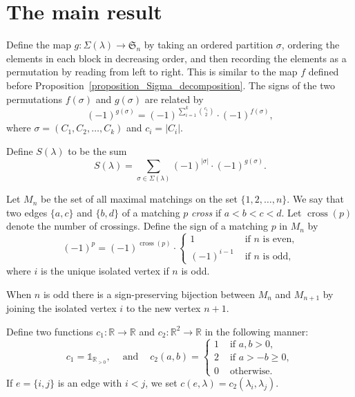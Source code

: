 \documentclass[ALCO,ThmDefs,Unicode,epreuves]{cedram}
\newcommand{\Rrr}{\mathbb{R}}
\newcommand{\Sym}{\mathfrak{S}}
\DeclareMathOperator{\cross}{cross}
\newcommand{\fl}{\rightarrow}
\newcommand{\ungras}{\mathds{1}}
\begin{document}
\section{The main result}
\label{section_main_result}

Define the map
$g : \Sigma(\lambda) \longrightarrow \Sym_{n}$
by taking  an ordered partition $\sigma$,
ordering the elements in each block in decreasing order,
and then
recording the elements as a permutation by reading from left to right.
This is similar to the map $f$ defined before
Proposition~\ref{proposition_Sigma_decomposition}.
The signs of the two permutations $f(\sigma)$ and $g(\sigma)$
are related by
$$
 (-1)^{g(\sigma)} = (-1)^{\sum_{i=1}^{k} \binom{c_{i}}{2}} \cdot (-1)^{f(\sigma)} ,
$$
where $\sigma = (C_{1},C_{2}, \ldots, C_{k})$ and $c_{i} = |C_{i}|$.

Define $S(\lambda)$ to be the sum
\begin{equation}
S(\lambda)
=
\sum_{\sigma \in \Sigma(\lambda)}
(-1)^{|\sigma|} \cdot (-1)^{g(\sigma)} . 
\label{equation_S_lambda}
\end{equation}


Let $M_{n}$ be the set of all
maximal matchings
on the set $\{1,2, \ldots,n\}$.
We say that two edges $\{a,c\}$ and $\{b,d\}$ of a matching $p$
\emph{cross} if $a<b<c<d$. Let $\cross(p)$ denote the number of crossings.
Define the sign of a matching $p$ in $M_{n}$
by
$$   (-1)^{p} = (-1)^{\cross(p)} \cdot
\begin{cases}
1 & \text{ if $n$ is even,} \\
(-1)^{i-1} & \text{ if $n$ is odd,}
\end{cases}
$$
where $i$ is the unique isolated vertex if $n$ is odd.

\begin{remark}
{\rm
When $n$ is odd
there is a sign-preserving bijection
between $M_{n}$ and $M_{n+1}$
by joining the isolated vertex $i$ to the new vertex $n+1$.
}
\label{remark_add_extra_edge}
\end{remark}








Define two functions $c_{1} : \Rrr \fl \Rrr$ and
$c_{2} : \Rrr^{2} \fl \Rrr$ in the following manner:
\[c_{1}=\ungras_{\Rrr_{>0}},
\:\:\:\: \text{ and } \:\:\:\:
c_{2}(a,b)=\left\{\begin{array}{ll}1 & \mbox{ if }a,b>0, \\
2 & \mbox{ if } a > -b \geq 0, \\
0 & \mbox{ otherwise.}\end{array}\right.\]
If $e=\{i,j\}$ is an edge with $i<j$, we set
$c(e,\lambda)=c_{2}(\lambda_{i},\lambda_{j})$.
\end{document}
